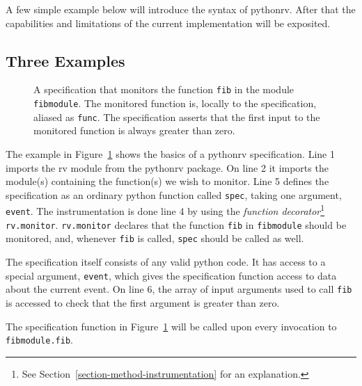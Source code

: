 \documentclass[a4paper,11pt]{kth-mag}
\begin{document}
A few simple example below will introduce the syntax of pythonrv. After that
the capabilities and limitations of the current implementation will be
exposited.

\subsection{Three Examples}
\lstset{language=Python,numbers=left}

\begin{figure}[h!]

	\begin{center}
	\begin{minipage}{0.7\textwidth}
	
	\end{minipage}
	\end{center}

	\caption{A specification that monitors the function \texttt{fib} in the
		module \texttt{fibmodule}. The monitored function is, locally to the
		specification, aliased as \texttt{func}. The specification asserts that the
		first input to the monitored function is always greater than zero.}
	\label{figure-syntax-example-1}
\end{figure}

The example in Figure~\ref{figure-syntax-example-1} shows the basics of a
pythonrv specification. Line 1 imports the rv module from the pythonrv package.
On line 2 it imports the module(s) containing the function(s) we wish to
monitor. Line 5 defines the specification as an ordinary python function called
\texttt{spec}, taking one argument, \texttt{event}. The instrumentation is done
line 4 by using the \textit{function decorator}\footnote{See
Section~\ref{section-method-instrumentation} for an explanation.}
\texttt{rv.monitor}. \texttt{rv.monitor} declares that the function
\texttt{fib} in \texttt{fibmodule} should be monitored, and, whenever
\texttt{fib} is called, \texttt{spec} should be called as well.


The specification itself consists of any valid python code. It has access to a
special argument, \texttt{event}, which gives the specification function access
to data about the current event. On line 6, the array of input arguments used
to call \texttt{fib} is accessed to check that the first argument is greater
than zero.

The specification function in Figure~\ref{figure-syntax-example-1} will be
called upon every invocation to \texttt{fibmodule.fib}.
\end{document}
